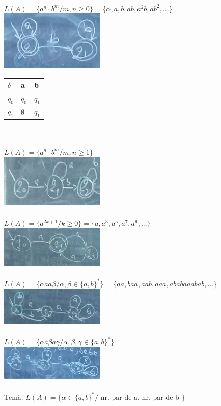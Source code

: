\documentclass[12pt]{extarticle}
\begin{document}
{		\\
		$L(A) = \{ a^{n} \cdot b^{m} / m, n \geq 0 \} = \{ \alpha, a, b, ab, a^{2}b, ab^{2}, ... \}$ \\
		\includegraphics[width=5cm]{figura4.png} \\
		\begin{tabular}{ l | l | l }
			$\delta$ & a & b \\ \hline
			$q_{0}$ & $q_{0}$ & $q_{1}$ \\ \hline
			$q_{1}$ & $\emptyset$ & $q_{1}$ \\
		\end{tabular} \\
		\\
		$L(A) = \{ a^{n} \cdot b^{m} / m, n \geq 1 \}$ \\
		\includegraphics[width=5cm]{figura5.png} \\
		\\
		$L(A) = \{ a^{2k + 1} / k \geq 0 \} = \{ a, a^{3}, a^{5}, a^{7}, a^{9}, ... \}$ \\
		\includegraphics[width=5cm]{figura6.png} \\
		\\
		$L(A) = \{ \alpha a a \beta / \alpha, \beta \in \{ a, b \}^{*} \} = \{ aa, baa, aab, aaa, ababaaabab, ... \}$ \\
		\includegraphics[width=5cm]{figura7.png} \\
		\\
		$L(A) = \{ \alpha a \beta a \gamma / \alpha, \beta, \gamma \in \{ a, b \}^{*} \}$ \\
		\includegraphics[width=5cm]{figura8.png} \\
		\\
		Temă: $L(A) = \{ \alpha \in \{ a, b \}^{*} / $ nr. par de a, nr. par de b $\}$
	}
\end{document}
